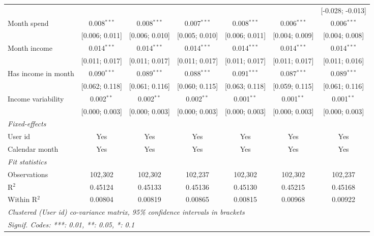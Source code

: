 \begin{table}[htbp]
\begin{threeparttable}[b]
\begin{tabular}{lcccccc}
                                    &                &                &                &                  &                  & [-0.028; -0.013]\\   
         Month spend                & 0.008$^{***}$  & 0.008$^{***}$  & 0.007$^{***}$  & 0.008$^{***}$    & 0.006$^{***}$    & 0.006$^{***}$\\   
                                    & [0.006; 0.011] & [0.006; 0.010] & [0.005; 0.010] & [0.006; 0.011]   & [0.004; 0.009]   & [0.004; 0.008]\\   
         Month income               & 0.014$^{***}$  & 0.014$^{***}$  & 0.014$^{***}$  & 0.014$^{***}$    & 0.014$^{***}$    & 0.014$^{***}$\\   
                                    & [0.011; 0.017] & [0.011; 0.017] & [0.011; 0.017] & [0.011; 0.017]   & [0.011; 0.017]   & [0.011; 0.016]\\   
         Has income in month        & 0.090$^{***}$  & 0.089$^{***}$  & 0.088$^{***}$  & 0.091$^{***}$    & 0.087$^{***}$    & 0.089$^{***}$\\   
                                    & [0.062; 0.118] & [0.061; 0.116] & [0.060; 0.115] & [0.063; 0.118]   & [0.059; 0.115]   & [0.061; 0.116]\\   
         Income variability         & 0.002$^{**}$   & 0.002$^{**}$   & 0.002$^{**}$   & 0.001$^{**}$     & 0.001$^{**}$     & 0.001$^{**}$\\   
                                    & [0.000; 0.003] & [0.000; 0.003] & [0.000; 0.003] & [0.000; 0.003]   & [0.000; 0.003]   & [0.000; 0.003]\\   
         \midrule
         \emph{Fixed-effects}\\
         User id                    & Yes            & Yes            & Yes            & Yes              & Yes              & Yes\\  
         Calendar month             & Yes            & Yes            & Yes            & Yes              & Yes              & Yes\\  
         \midrule
         \emph{Fit statistics}\\
         Observations               & 102,302        & 102,302        & 102,237        & 102,302          & 102,302          & 102,237\\  
         R$^2$                      & 0.45124        & 0.45133        & 0.45136        & 0.45130          & 0.45215          & 0.45168\\  
         Within R$^2$               & 0.00804        & 0.00819        & 0.00865        & 0.00815          & 0.00968          & 0.00922\\  
         \midrule \midrule
         \multicolumn{7}{l}{\emph{Clustered (User id) co-variance matrix, 95\% confidence intervals in brackets}}\\
         \multicolumn{7}{l}{\emph{Signif. Codes: ***: 0.01, **: 0.05, *: 0.1}}\\
      \end{tabular}
   \end{threeparttable}
\end{table}


